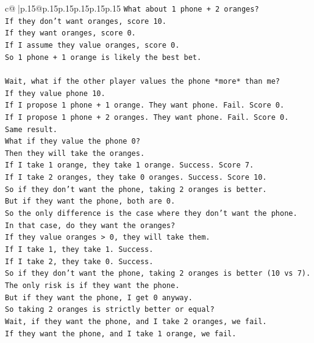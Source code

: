\documentclass{article}
\begin{document}
{\begin{supertabular}{c@{$\;$}|p{.15\linewidth}@{}p{.15\linewidth}p{.15\linewidth}p{.15\linewidth}p{.15\linewidth}p{.15\linewidth}}
{{{\texttt{What about 1 phone + 2 oranges?} \\
\texttt{If they don't want oranges, score 10.} \\
\texttt{If they want oranges, score 0.} \\
\texttt{If I assume they value oranges, score 0.} \\
\texttt{So 1 phone + 1 orange is likely the best bet.} \\
\\ 
\texttt{Wait, what if the other player values the phone *more* than me?} \\
\texttt{If they value phone 10.} \\
\texttt{If I propose 1 phone + 1 orange. They want phone. Fail. Score 0.} \\
\texttt{If I propose 1 phone + 2 oranges. They want phone. Fail. Score 0.} \\
\texttt{Same result.} \\
\texttt{What if they value the phone 0?} \\
\texttt{Then they will take the oranges.} \\
\texttt{If I take 1 orange, they take 1 orange. Success. Score 7.} \\
\texttt{If I take 2 oranges, they take 0 oranges. Success. Score 10.} \\
\texttt{So if they don't want the phone, taking 2 oranges is better.} \\
\texttt{But if they want the phone, both are 0.} \\
\texttt{So the only difference is the case where they don't want the phone.} \\
\texttt{In that case, do they want the oranges?} \\
\texttt{If they value oranges > 0, they will take them.} \\
\texttt{If I take 1, they take 1. Success.} \\
\texttt{If I take 2, they take 0. Success.} \\
\texttt{So if they don't want the phone, taking 2 oranges is better (10 vs 7).} \\
\texttt{The only risk is if they want the phone.} \\
\texttt{But if they want the phone, I get 0 anyway.} \\
\texttt{So taking 2 oranges is strictly better or equal?} \\
\texttt{Wait, if they want the phone, and I take 2 oranges, we fail.} \\
\texttt{If they want the phone, and I take 1 orange, we fail.} \\
}}}
\end{supertabular}}
\end{document}
